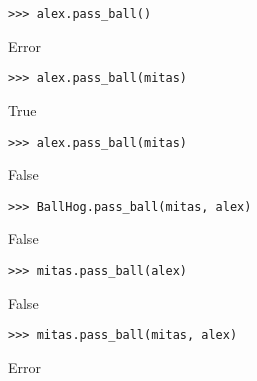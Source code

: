 \begin{blocksection}
\begin{lstlisting}
>>> alex.pass_ball()
\end{lstlisting}
\begin{solution}[.2in]
Error
\end{solution}

\begin{lstlisting}
>>> alex.pass_ball(mitas)
\end{lstlisting}
\begin{solution}[.2in]
True
\end{solution}

\begin{lstlisting}
>>> alex.pass_ball(mitas)
\end{lstlisting}
\begin{solution}[.2in]
False
\end{solution}

\begin{lstlisting}
>>> BallHog.pass_ball(mitas, alex)
\end{lstlisting}
\begin{solution}[.2in]
False
\end{solution}

\begin{lstlisting}
>>> mitas.pass_ball(alex)
\end{lstlisting}
\begin{solution}[.2in]
False
\end{solution}

\begin{lstlisting}
>>> mitas.pass_ball(mitas, alex)
\end{lstlisting}
\begin{solution}[.2in]
Error
\end{solution}
\end{blocksection}
